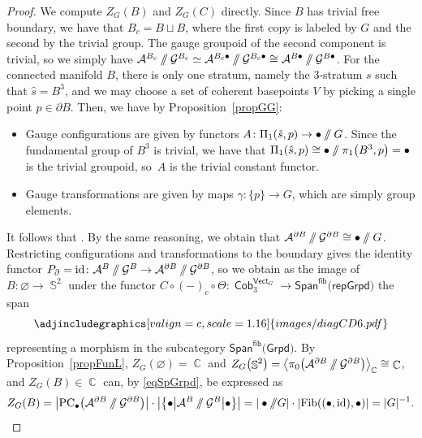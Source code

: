 \documentclass[10pt,a4paper]{amsart}
\DeclareMathOperator{\id}{id}
\DeclareMathOperator{\vect}{\mathsf{Vect}}
\DeclareMathOperator{\C}{\mathbb{C}}
\DeclareMathOperator{\Sp}{\mathbb{S}}
\DeclareMathOperator{\Cob}{\mathsf{Cob}}
\newcommand{\sslash}{\mathbin{/\mkern-6mu/}}
\numberwithin{equation}{section}
\theoremstyle{definition}
\begin{document}
\begin{proof}
 We compute $Z_G(B)$ and $Z_G(C)$ directly. Since $B$ has trivial free boundary, we have that $B_c = B \sqcup B$, where the first copy is labeled by $G$ and the second by the trivial group. The gauge groupoid of the second component is trivial, so we simply have $ \allowbreak \mathcal{A}^{B_c} \sslash \mathcal{G}^{B_c} \simeq \mathcal{A}^{{B_c} \bullet} \sslash \mathcal{G}^{{B_c} \bullet} \cong \mathcal{A}^{{B} \bullet} \sslash \mathcal{G}^{{B} \bullet}$. For the connected manifold $B$, there is only one stratum, namely the 3-stratum $s$ such that $\hat{s} = B^3$, and we may choose a set of coherent basepoints $V$ by picking a single point $p \in \partial B$. Then, we have by Proposition~\ref{propGG}:
 \begin{itemize}\itemsep=0pt
 \item Gauge configurations are given by functors $A\colon \Pi_1(\hat{s}, p) \rightarrow \bullet \sslash G$. Since the fundamental group of $B^3$ is trivial, we have that $\Pi_1(\hat{s}, p) \cong \bullet \sslash \pi_1\bigl(B^3, p\bigr) = \bullet$ is the trivial groupoid, so~$A$ is the trivial constant functor.
 \item Gauge transformations are given by maps $\gamma\colon \{p\} \rightarrow G$, which are simply group elements.
 \end{itemize}
 It follows that \smash{$\mathcal{A}^B \sslash \mathcal{G}^B \cong \bullet \sslash G$}. By the same reasoning, we obtain that ${\smash{\mathcal{A}^{\partial B} \sslash \mathcal{G}^{\partial B}} \cong \bullet \sslash G}$. Restricting configurations and transformations to the boundary gives the identity functor $P_{\partial} = \id\colon \smash{\mathcal{A}^B \sslash \mathcal{G}^B \rightarrow \mathcal{A}^{\partial B} \sslash \mathcal{G}^{\partial B}}$, so we obtain as the image of $B\colon \varnothing \rightarrow \Sp^2$ under the functor $C \circ (-)_c \circ \Theta\colon \Cob_3^{\vect_G} \rightarrow \mathsf{Span}^{\mathsf{fib}}(\mathsf{repGrpd)}$ the span
 \[
 \centering
 \adjincludegraphics[valign=c, scale = 1.16]{images/diagCD6.pdf}
 \]
 representing a morphism in the subcategory $\mathsf{Span}^{\mathsf{fib}}(\mathsf{Grpd)}$. By Proposition~\ref{propFunL}, $Z_G(\varnothing) = \C$ and $Z_G\bigl(\Sp^2\bigr) = \bigl\langle\pi_0\bigl(\mathcal{A}^{\partial B} \sslash \mathcal{G}^{\partial B}\bigr)\bigr\rangle_{\C} \cong \C$, and $Z_G(B) \in \C$ can, by \eqref{eqSpGrpd}, be expressed as
 \begin{align*}
 Z_G(B) = \bigl|\mathrm{PC}_{\bullet}\bigl(\mathcal{A}^{\partial B} \sslash \mathcal{G}^{\partial B}\bigr)\bigr| \cdot \bigl|\bigl\{\bullet \bigl| \mathcal{A}^{ B} \sslash \mathcal{G}^{ B} \bigr| \bullet\bigr\}\bigr| = |\bullet \sslash G| \cdot |\mathrm{Fib}((\bullet, \id), \bullet)| = |G|^{-1}.

\end{align*}
\end{proof}
\end{document}
